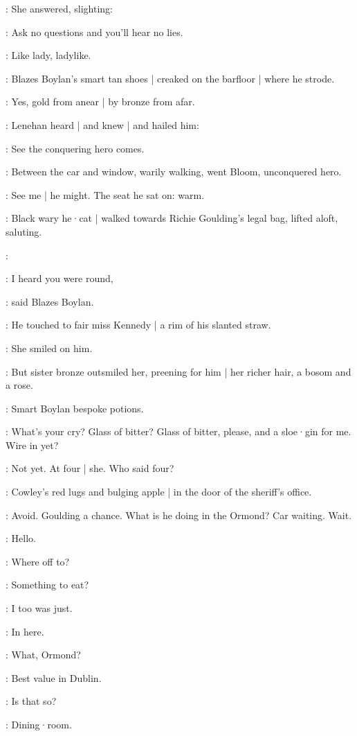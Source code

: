 :
She answered,
slighting:

\MissK:
Ask no questions and you'll hear no lies.

:
Like lady,
ladylike.

:
Blazes Boylan's smart tan shoes |
creaked on the barfloor |
where he strode.

:
Yes,
gold from anear |
by bronze from afar.

:
Lenehan heard |
and knew |
and hailed him:

\lenehan:
See the conquering hero comes.

:
Between the car and window,
warily walking,
went Bloom,
unconquered hero.

\BloomInt:
See me |
he might.
The seat he sat on:
warm.

:
Black wary he·cat |
walked towards Richie Goulding's legal bag,
lifted aloft,
saluting.

\simon:

\boylan:
I heard you were round,

:
said Blazes Boylan.

:
He touched to fair miss Kennedy |
a rim of his slanted straw.

:
She smiled on him.

:
But sister bronze outsmiled her,
preening for him |
her richer hair,
a bosom
and a rose.

:
Smart Boylan bespoke potions.

\boylan:
What's your cry?
Glass of bitter?
Glass of bitter, please,
and a sloe·gin for me.
Wire in yet?

\BloomInt:
Not yet.
At four |
she.
Who said four?

:
Cowley's red lugs and bulging apple |
in the door of the sheriff's office.

\BloomInt:
Avoid.
Goulding a chance.
What is he doing in the Ormond?
Car waiting.
Wait.

\Bloom:
Hello.

\goulding:
Where off to?

\Bloom:
Something to eat?

\goulding:
I too was just.

\Bloom:
In here.

\goulding:
What,
Ormond?

\Bloom:
Best value in Dublin.

\goulding:
Is that so?

\Bloom:
Dining·room.


